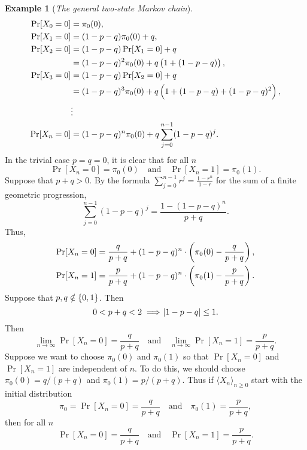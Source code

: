 \documentclass[12pt,openany]{book}
\theoremstyle{definition}
\newtheorem{example}{Example}[chapter]
\begin{document}
\begin{example}[\textit{The general two-state Markov chain}]
\begin{align*}
	\Pr[X_0=0]&=\pi_0(0),\\
	\Pr[X_1=0]&=(1-p-q)\pi_0(0)+q,\\
	\Pr[X_2=0]&=(1-p-q)\Pr[X_1=0]+q\\&=(1-p-q)^2\pi_0(0)+q\del{1+(1-p-q)},\\
	\Pr[X_3=0]&=(1-p-q)\Pr[X_2=0]+q\\&=(1-p-q)^3\pi_0(0)+q\del{1+(1-p-q)+(1-p-q)^2},\\
	&\vdots\\
	\Pr[X_n=0]&=(1-p-q)^n\pi_0(0) + q\sum_{j=0}^{n-1}(1-p-q)^j.
\end{align*} In the trivial case $p=q=0$, it is clear that for all $n$ \[
	\Pr[X_n=0]=\pi_0(0)\quad\text{and}\quad \Pr[X_n=1]=\pi_0(1).
\]	Suppose that $p+q>0$. By the formula $\displaystyle\sum_{j=0}^{n-1}r^j=\frac{1-r^n}{1-r}$ for the sum of a finite geometric progression, \[
	\sum_{j=0}^{n-1}(1-p-q)^j=\frac{1-(1-p-q)^n}{p+q}.
	\] Thus, \begin{align*}
		\Pr[X_n=0]&=\frac{q}{p+q}+(1-p-q)^n\cdot\del{\pi_0(0)-\frac{q}{p+q}},\\
		\Pr[X_n=1]&=\frac{p}{p+q}+(1-p-q)^n\cdot\del{\pi_0(1)-\frac{p}{p+q}}.
	\end{align*} Suppose that $p,q\notin\set{0,1}$. Then \[
	0<p+q<2\implies\abs{1-p-q}\leq 1.
	\] Then \[
	\lim\limits_{n\to\infty}\Pr[X_n=0]=\frac{q}{p+q}\quad\text{and}\quad\lim\limits_{n\to\infty}\Pr[X_n=1]=\frac{p}{p+q}.
	\] Suppose we want to choose $\pi_0(0)$ and $\pi_0(1)$ so that $\Pr[X_n=0]$ and $\Pr[X_n=1]$ are independent of $n$. To do this, we should choose $\pi_0(0)=q/(p+q)$ and $\pi_0(1)=p/(p+q)$.
	Thus if $\langle X_n\rangle_{n\geq 0}$ start with the initial distribution \[
	\pi_0=\Pr[X_n=0]=\frac{q}{p+q}\quad\text{and}\quad\pi_0(1)=\frac{p}{p+q},
	\] then for all $n$ \[
	\Pr[X_n=0]=\frac{q}{p+q}\quad\text{and}\quad\Pr[X_n=1]=\frac{p}{p+q}.
	\]
	\end{example}
\end{document}
